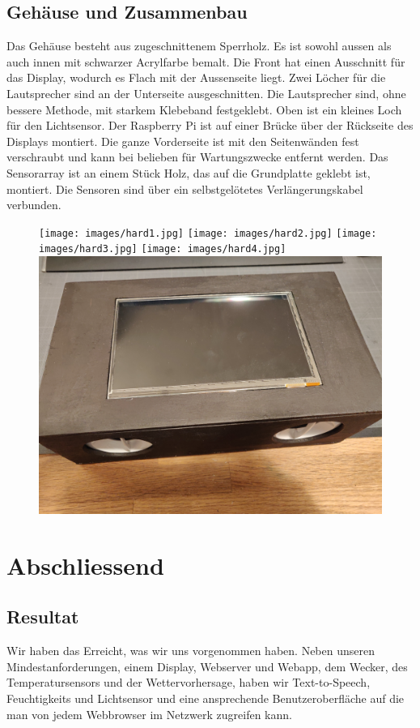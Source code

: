 \documentclass[11pt,a4paper]{article}
\begin{document}
\subsection{Gehäuse und Zusammenbau}
Das Gehäuse besteht aus zugeschnittenem Sperrholz. Es ist sowohl aussen als auch innen mit schwarzer Acrylfarbe bemalt. Die Front hat einen Ausschnitt für das Display, wodurch es Flach mit der Aussenseite liegt. Zwei Löcher für die Lautsprecher sind an der Unterseite ausgeschnitten. Die Lautsprecher sind, ohne bessere Methode, mit starkem Klebeband festgeklebt. Oben ist ein kleines Loch für den Lichtsensor. Der Raspberry Pi ist auf einer Brücke über der Rückseite des Displays montiert. Die ganze Vorderseite ist mit den Seitenwänden fest verschraubt und kann bei belieben für Wartungszwecke entfernt werden. Das Sensorarray ist an einem Stück Holz, das auf die Grundplatte geklebt ist, montiert. Die Sensoren sind über ein selbstgelötetes Verlängerungskabel verbunden.

\begin{figure}[H]
\texttt{[image: images/hard1.jpg]}
\texttt{[image: images/hard2.jpg]}
\texttt{[image: images/hard3.jpg]}
\texttt{[image: images/hard4.jpg]}
\includegraphics[width=.5\textwidth]{images/hard5.jpg}
\end{figure}

\section{Abschliessend}
\subsection{Resultat}
Wir haben das Erreicht, was wir uns vorgenommen haben. Neben unseren Mindestanforderungen, einem Display, Webserver und Webapp, dem Wecker, des Temperatursensors und der Wettervorhersage, haben wir Text-to-Speech, Feuchtigkeits und Lichtsensor und eine ansprechende Benutzeroberfläche auf die man von jedem Webbrowser im Netzwerk zugreifen kann.
\end{document}
